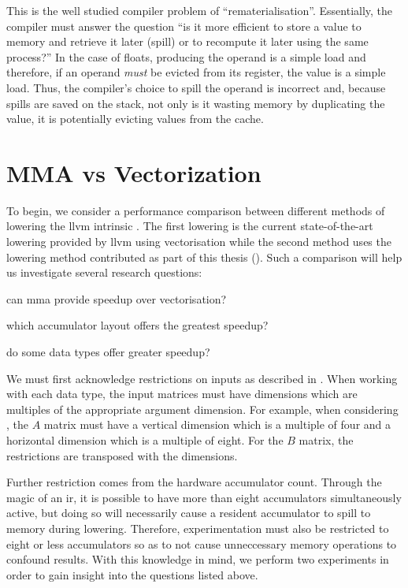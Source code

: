 \documentclass[\main/thesis.tex]{subfiles}
\begin{document}
This is the well studied compiler problem of ``\gls{rematerialisation}''.
Essentially, the compiler must answer the question ``is it more efficient to store a value to memory and retrieve it later (\gls{spill}) or to recompute it later using the same process?''
In the case of floats, producing the operand is a simple load and therefore, if an operand \emph{must} be evicted from its register,  the value is a simple load.
Thus, the compiler's choice to spill the operand is incorrect and, because spills are saved on the stack, not only is it wasting memory by duplicating the value, it is potentially evicting values from the cache.

\section{MMA vs Vectorization}
\label{sec:mmaVsVec}
To begin, we consider a performance comparison between different methods of \gls{lowering} the \gls{llvm} intrinsic .
The first lowering is the current state-of-the-art lowering provided by \gls{llvm} using \gls{vectorisation} while the second method uses the \gls{lowering} method contributed as part of this thesis ().
Such a comparison will help us investigate several research questions:
\begin{enumerate*}[itemjoin*={{ and }}, label=\textbf{(\arabic*)}]
  \item can \gls{mma} provide speedup over \gls{vectorisation}?
  \item which accumulator layout offers the greatest speedup?
  \item do some data types offer greater speedup?
\end{enumerate*}

We must first acknowledge restrictions on inputs as described in .
When working with each data type, the input matrices must have dimensions which are multiples of the appropriate argument dimension.
For example, when considering , the $A$ matrix must have a vertical dimension which is a multiple of four and a horizontal dimension which is a multiple of eight.
For the $B$ matrix, the restrictions are transposed with the dimensions.

Further restriction comes from the hardware accumulator count.
Through the magic of an \gls{ir}, it is possible to have more than eight accumulators simultaneously active, but doing so will necessarily cause a resident accumulator to \gls{spill} to memory during \gls{lowering}.
Therefore, experimentation must also be restricted to eight or less accumulators so as to not cause unneccessary memory operations to confound results.
With this knowledge in mind, we perform two experiments in order to gain insight into the questions listed above.
\end{document}
